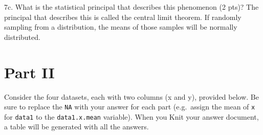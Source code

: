 \documentclass[
]{article}
\begin{document}
7c. What is the statistical principal that describes this phenomenon (2
pts)? The principal that describes this is called the central limit
theorem. If randomly sampling from a distribution, the means of those
samples will be normally distributed.

\hypertarget{part-ii}{%
\section{Part II}\label{part-ii}}

Consider the four datasets, each with two columns (x and y), provided
below. Be sure to replace the \texttt{NA} with your answer for each part
(e.g.~assign the mean of \texttt{x} for \texttt{data1} to the
\texttt{data1.x.mean} variable). When you Knit your answer document, a
table will be generated with all the answers.
\end{document}
